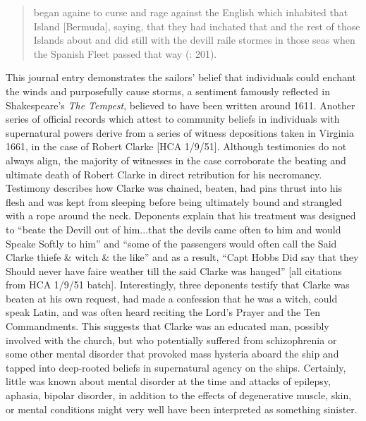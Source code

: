 \begin{quotation}
began againe to curse and rage against the English which inhabited that Island [Bermuda], saying, that they had inchated that and the rest of those Islands about and did still with the devill raile stormes in those seas when the Spanish Fleet passed that way (\citealt{Gage1648}: 201). 
\end{quotation}

This journal entry demonstrates the sailors’ belief that individuals could enchant the winds and purposefully cause storms, a sentiment famously reflected in Shakespeare’s \textit{The Tempest}, believed to have been written around 1611. Another series of official records which attest to community beliefs in individuals with supernatural powers derive from a series of witness depositions taken in  Virginia 1661, in the case of Robert Clarke [HCA 1/9/51]. Although testimonies do not always align, the majority of witnesses in the case corroborate the beating and ultimate death of Robert Clarke in direct retribution for his necromancy. Testimony describes how Clarke was chained, beaten, had pins thrust into his flesh and was kept from sleeping before being ultimately bound and strangled with a rope around the neck. Deponents explain that his treatment was designed to “beate the Devill out of him...that the devils came often to him and would Speake Softly to him” and “some of the passengers would often call the Said Clarke thiefe \& witch \& the like” and as a result, “Capt Hobbs Did say that they Should never have faire weather till the said Clarke was hanged” [all citations from HCA 1/9/51 batch]. Interestingly, three deponents testify that Clarke was beaten at his own request, had made a confession that he was a witch, could speak Latin, and was often heard reciting the Lord’s Prayer and the Ten Commandments. This suggests that Clarke was an educated man, possibly involved with the church, but who potentially suffered from schizophrenia or some other mental disorder that provoked mass hysteria aboard the ship and tapped into deep-rooted beliefs in supernatural agency on the ships. Certainly, little was known about mental disorder at the time and attacks of epilepsy, aphasia, bipolar disorder, in addition to the effects of degenerative muscle, skin, or mental conditions might very well have been interpreted as something sinister. 

